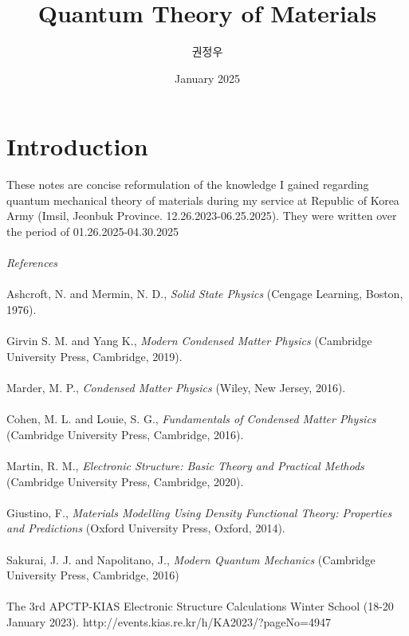 \documentclass{article}
\title{Quantum Theory of Materials}
\author{권정우}
\date{January 2025}
\begin{document}
\maketitle
\section*{Introduction}
These notes are concise reformulation of the knowledge I gained regarding quantum mechanical theory of materials during my service at Republic of Korea Army (Imsil, Jeonbuk Province. 12.26.2023-06.25.2025). They were written over the period of 01.26.2025-04.30.2025\\
\\
\textit{References}\\
\\
Ashcroft, N. and Mermin, N. D., \textit{Solid State Physics} (Cengage Learning, Boston, 1976).\\
\\
Girvin S. M. and Yang K., \textit{Modern Condensed Matter Physics} (Cambridge University Press, Cambridge, 2019).\\
\\
Marder, M. P., \textit{Condensed Matter Physics} (Wiley, New Jersey, 2016).\\
\\
Cohen, M. L. and Louie, S. G., \textit{Fundamentals of Condensed Matter Physics} (Cambridge University Press, Cambridge, 2016).\\
\\
Martin, R. M., \textit{Electronic Structure: Basic Theory and Practical Methods} (Cambridge University Press, Cambridge, 2020).\\
\\
Giustino, F., \textit{Materials Modelling Using Density Functional Theory: Properties and Predictions} (Oxford University Press, Oxford, 2014).\\
\\
Sakurai, J. J. and Napolitano, J., \textit{Modern Quantum Mechanics} (Cambridge University Press, Cambridge, 2016)\\
\\
The 3rd APCTP-KIAS Electronic Structure Calculations Winter School (18-20 January 2023). http://events.kias.re.kr/h/KA2023/?pageNo=4947\\
\end{document}
